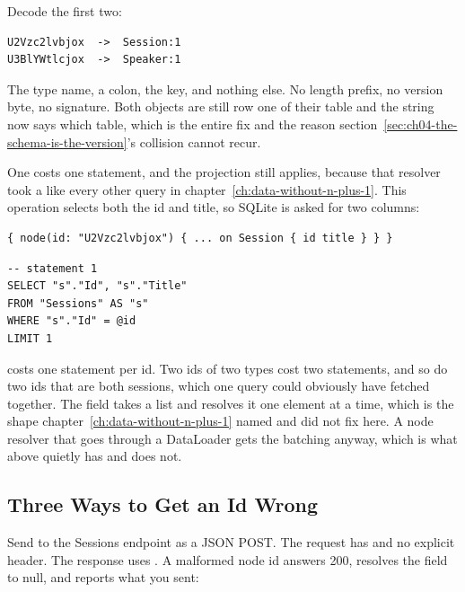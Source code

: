 Decode the first two:

\begin{verbatim}
U2Vzc2lvbjox  ->  Session:1
U3BlYWtlcjox  ->  Speaker:1
\end{verbatim}

%
The type name, a colon, the key, and nothing else. No length prefix, no
version byte, no signature. Both objects are still row one of their table and
the string now says which table, which is the entire fix and the reason
section~\ref{sec:ch04-the-schema-is-the-version}'s collision cannot recur.

%
One  costs one statement, and the projection still applies, because
that resolver took a  like every other query in
chapter~\ref{ch:data-without-n-plus-1}. This operation selects both the id
and title, so SQLite is asked for two columns:

\begin{verbatim}
{ node(id: "U2Vzc2lvbjox") { ... on Session { id title } } }
\end{verbatim}

\begin{verbatim}
-- statement 1
SELECT "s"."Id", "s"."Title"
FROM "Sessions" AS "s"
WHERE "s"."Id" = @id
LIMIT 1
\end{verbatim}

%
 costs one statement per id. Two ids of two types cost two
statements, and so do two ids that are both sessions, which one query could
obviously have fetched together. The field takes a list and resolves it one
element at a time, which is the shape
chapter~\ref{ch:data-without-n-plus-1} named and did not fix here. A node
resolver that goes through a DataLoader gets the batching anyway, which is
what  above quietly has and  does not.

\subsection{Three Ways to Get an Id Wrong}

%
Send  to the Sessions endpoint
as a JSON POST. The request has  and no
explicit  header. The response uses
. A malformed node id
answers 200, resolves the field to null, and reports what you sent:

